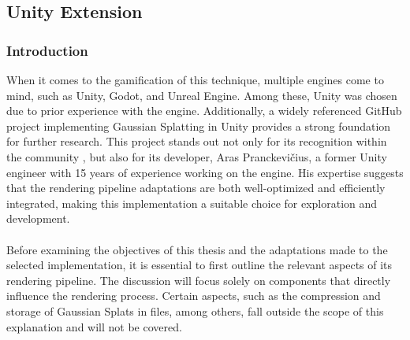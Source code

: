 \documentclass[12pt]{article}
\begin{document}
\subsection{Unity Extension}
\subsubsection{Introduction}
When it comes to the gamification of this technique, multiple engines come to mind, such as Unity, Godot, and Unreal Engine. Among these, Unity was chosen due to prior experience with the engine. Additionally, a widely referenced GitHub project \parencite{Aras} implementing Gaussian Splatting in Unity provides a strong foundation for further research. This project stands out not only for its recognition within the community \parencite{ArasRecc1} \parencite{ArasRecc2}, but also for its developer, Aras Pranckevičius, a former Unity engineer with 15 years of experience working on the engine. His expertise suggests that the rendering pipeline adaptations are both well-optimized and efficiently integrated, making this implementation a suitable choice for exploration and development.
\\\\
Before examining the objectives of this thesis and the adaptations made to the selected implementation, it is essential to first outline the relevant aspects of its rendering pipeline. The discussion will focus solely on components that directly influence the rendering process. Certain aspects, such as the compression and storage of Gaussian Splats in files, among others, fall outside the scope of this explanation and will not be covered.
\end{document}

